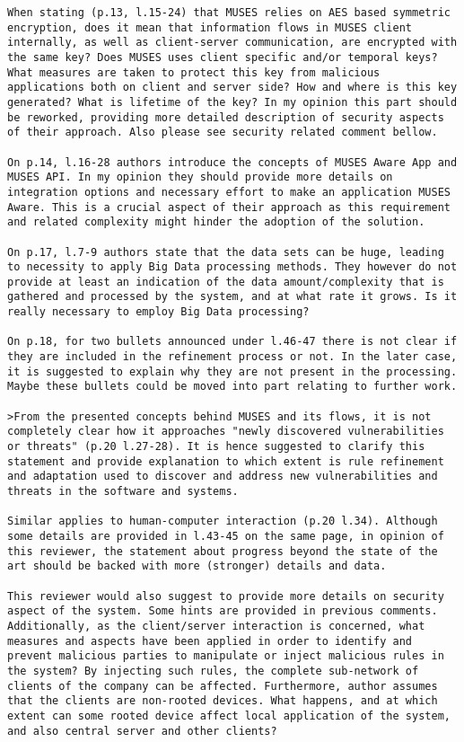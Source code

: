 \documentclass[preprint]{elsarticle}
\begin{document}
\begin{verbatim}
When stating (p.13, l.15-24) that MUSES relies on AES based symmetric encryption, does it mean that information flows in MUSES client internally, as well as client-server communication, are encrypted with the same key? Does MUSES uses client specific and/or temporal keys? What measures are taken to protect this key from malicious applications both on client and server side? How and where is this key generated? What is lifetime of the key? In my opinion this part should be reworked, providing more detailed description of security aspects of their approach. Also please see security related comment bellow.

On p.14, l.16-28 authors introduce the concepts of MUSES Aware App and MUSES API. In my opinion they should provide more details on integration options and necessary effort to make an application MUSES Aware. This is a crucial aspect of their approach as this requirement and related complexity might hinder the adoption of the solution.

On p.17, l.7-9 authors state that the data sets can be huge, leading to necessity to apply Big Data processing methods. They however do not provide at least an indication of the data amount/complexity that is gathered and processed by the system, and at what rate it grows. Is it really necessary to employ Big Data processing?

On p.18, for two bullets announced under l.46-47 there is not clear if they are included in the refinement process or not. In the later case, it is suggested to explain why they are not present in the processing. Maybe these bullets could be moved into part relating to further work.

>From the presented concepts behind MUSES and its flows, it is not completely clear how it approaches "newly discovered vulnerabilities or threats" (p.20 l.27-28). It is hence suggested to clarify this statement and provide explanation to which extent is rule refinement and adaptation used to discover and address new vulnerabilities and threats in the software and systems.

Similar applies to human-computer interaction (p.20 l.34). Although some details are provided in l.43-45 on the same page, in opinion of this reviewer, the statement about progress beyond the state of the art should be backed with more (stronger) details and data.

This reviewer would also suggest to provide more details on security aspect of the system. Some hints are provided in previous comments. Additionally, as the client/server interaction is concerned, what measures and aspects have been applied in order to identify and prevent malicious parties to manipulate or inject malicious rules in the system? By injecting such rules, the complete sub-network of clients of the company can be affected. Furthermore, author assumes that the clients are non-rooted devices. What happens, and at which extent can some rooted device affect local application of the system, and also central server and other clients?


\end{verbatim}
\end{document}
